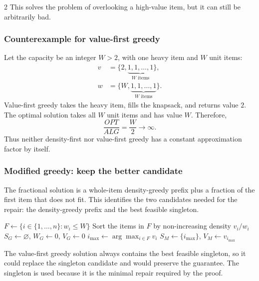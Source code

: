 \documentclass[10pt]{article}
\theoremstyle{definition}
\begin{document}
\begin{multicols*}{2}
This solves the problem of overlooking a high-value item, but it can still be arbitrarily bad.
\subsubsection*{Counterexample for value-first greedy}
Let the capacity be an integer $W>2$, with one heavy item and $W$ unit items:
\begin{align*}
  v &= \{2, \underbrace{1,1,\ldots,1}_{W\text{ items}}\},\\
  w &= \{W, \underbrace{1,1,\ldots,1}_{W\text{ items}}\}.
\end{align*}
Value-first greedy takes the heavy item, fills the knapsack, and returns value $2$. The optimal solution takes all $W$ unit items and has value $W$. Therefore,
\[
  \frac{OPT}{ALG}=\frac{W}{2}\longrightarrow\infty.
\]
Thus neither density-first nor value-first greedy has a constant approximation factor by itself.

\subsubsection*{Modified greedy: keep the better candidate}
The fractional solution is a whole-item density-greedy prefix plus a fraction of the first item that does not fit. This identifies the two candidates needed for the repair: the density-greedy prefix and the best feasible singleton.


\begin{algorithm}[H]
  \caption{Modified two-candidate greedy for 0/1 knapsack}
  $F \gets \{i \in \{1,\ldots,n\}:w_i\leq W\}$\;
  Sort the items in $F$ by non-increasing density $v_i/w_i$\;
  $S_G \gets \varnothing$, $W_G \gets 0$, $V_G \gets 0$\;
  $i_{\max}\gets\arg\max_{i\in F}v_i$\;
  $S_M\gets\{i_{\max}\}$, $V_M\gets v_{i_{\max}}$\;
\end{algorithm}

The value-first greedy solution always contains the best feasible singleton, so it could replace the singleton candidate and would preserve the guarantee. The singleton is used because it is the minimal repair required by the proof.




\end{multicols*}
\end{document}
